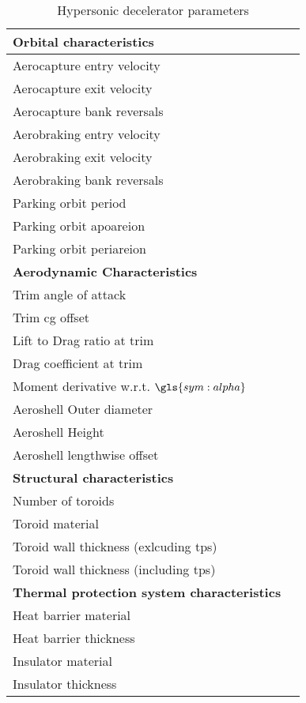 \begin{table}
	\centering
	\caption{Hypersonic decelerator parameters}
	\label{tab:DeceleratorPar}
	\begin{tabular}{|l|l|} \hline
		\textbf{Orbital characteristics}             	& 			\\ \hline \hline
		Aerocapture entry velocity       				&	  		\\ \hline
		Aerocapture exit velocity				 		&     	  	\\ \hline
		Aerocapture bank reversals				        &  	   		\\ \hline
		Aerobraking entry velocity					 	&  			\\ \hline
		Aerobraking exit velocity					 	&  			\\ \hline
		Aerobraking bank reversals					 	&  			\\ \hline
		Parking orbit period						 	&  			\\ \hline
		Parking orbit apoareion			 				&  			\\ \hline
		Parking orbit periareion			 			&  			\\ \hline
		\textbf{Aerodynamic Characteristics}			&			\\ \hline \hline
		Trim angle of attack				 			&  			\\ \hline
		Trim \gls{cg} offset							&			\\ \hline
		Lift to Drag ratio at trim			 			&  			\\ \hline
		Drag coefficient at trim			 			&  			\\ \hline
		Moment derivative w.r.t. $\gls{sym:alpha}$		&  			\\ \hline
		Aeroshell Outer diameter						&  			\\ \hline
		Aeroshell Height								&  			\\ \hline
		Aeroshell lengthwise offset						&  			\\ \hline
		\textbf{Structural characteristics}				&			\\ \hline
		Number of toroids					 			&  			\\ \hline \hline
		Toroid material						 			&  			\\ \hline
		Toroid wall thickness (exlcuding \gls{tps})		&			\\ \hline
		Toroid wall thickness (including \gls{tps})		&			\\ \hline
		\textbf{Thermal protection system characteristics}	&		\\ \hline \hline
		Heat barrier material							&			\\ \hline
		Heat barrier thickness							&			\\ \hline
		Insulator material								&			\\ \hline
		Insulator thickness								&			\\ \hline
			
		
	\end{tabular}
\end{table}

